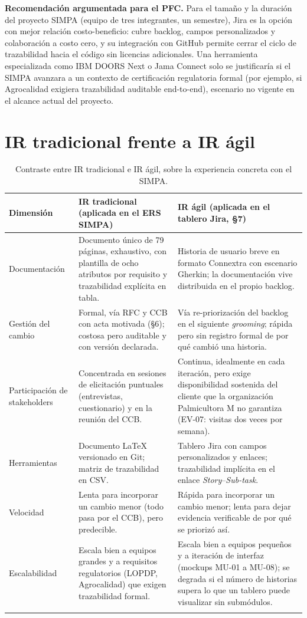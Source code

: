 \documentclass[11pt,a4paper]{article}
\begin{document}
\noindent\textbf{Recomendación argumentada para el PFC.} Para el tamaño y la duración del
proyecto SIMPA (equipo de tres integrantes, un semestre), Jira es la opción con mejor relación
costo-beneficio: cubre backlog, campos personalizados y colaboración a costo cero, y su
integración con GitHub permite cerrar el ciclo de trazabilidad hacia el código sin licencias
adicionales. Una herramienta especializada como IBM DOORS Next o Jama Connect solo se justificaría
si el SIMPA avanzara a un contexto de certificación regulatoria formal (por ejemplo, si Agrocalidad
exigiera trazabilidad auditable end-to-end), escenario no vigente en el alcance actual del
proyecto.

\section{IR tradicional frente a IR ágil}

\begin{longtable}{p{2.6cm}p{5.0cm}p{5.0cm}}
\toprule
\textbf{Dimensión} & \textbf{IR tradicional (aplicada en el ERS SIMPA)} & \textbf{IR ágil (aplicada en el tablero Jira, \S7)} \\
\midrule
\endhead
Documentación & Documento único de 79 páginas, exhaustivo, con plantilla de ocho atributos por requisito y trazabilidad explícita en tabla. & Historia de usuario breve en formato Connextra con escenario Gherkin; la documentación vive distribuida en el propio backlog. \\
Gestión del cambio & Formal, vía RFC y CCB con acta motivada (\S6); costosa pero auditable y con versión declarada. & Vía re-priorización del backlog en el siguiente \emph{grooming}; rápida pero sin registro formal de por qué cambió una historia. \\
Participación de stakeholders & Concentrada en sesiones de elicitación puntuales (entrevistas, cuestionario) y en la reunión del CCB. & Continua, idealmente en cada iteración, pero exige disponibilidad sostenida del cliente que la organización Palmicultora M no garantiza (EV-07: visitas dos veces por semana). \\
Herramientas & Documento LaTeX versionado en Git; matriz de trazabilidad en CSV. & Tablero Jira con campos personalizados y enlaces; trazabilidad implícita en el enlace \emph{Story}--\emph{Sub-task}. \\
Velocidad & Lenta para incorporar un cambio menor (todo pasa por el CCB), pero predecible. & Rápida para incorporar un cambio menor; lenta para dejar evidencia verificable de por qué se priorizó así. \\
Escalabilidad & Escala bien a equipos grandes y a requisitos regulatorios (LOPDP, Agrocalidad) que exigen trazabilidad formal. & Escala bien a equipos pequeños y a iteración de interfaz (mockups MU-01 a MU-08); se degrada si el número de historias supera lo que un tablero puede visualizar sin submódulos. \\
\bottomrule
\caption{Contraste entre IR tradicional e IR ágil, sobre la experiencia concreta con el SIMPA.}
\end{longtable}
\end{document}

